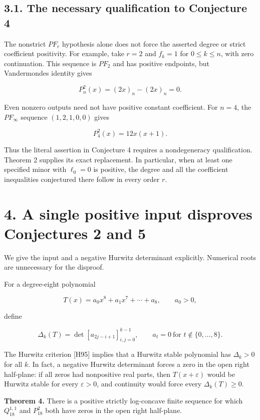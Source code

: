 \documentclass[11pt]{article}
\begin{document}
\subsection{3.1. The necessary qualification to Conjecture
4}\label{the-necessary-qualification-to-conjecture-4}

The nonstrict \(PF_r\) hypothesis alone does not force the asserted
degree or strict coefficient positivity. For example, take \(r=2\) and
\(f_k=1\) for \(0\le k\le n\), with zero continuation. This sequence is
\(PF_2\) and has positive endpoints, but Vandermonde\textquotesingle s
identity gives

\[
P_n^2(x)=(2x)_n-(2x)_n=0.
\tag{11}
\]

Even nonzero outputs need not have positive constant coefficient. For
\(n=4\), the \(PF_\infty\) sequence \((1,2,1,0,0)\) gives

\[
P_4^2(x)=12x(x+1).
\tag{12}
\]

Thus the literal assertion in Conjecture 4 requires a nondegeneracy
qualification. Theorem 2 supplies its exact replacement. In particular,
when at least one specified minor with \(\ell_0=0\) is positive, the
degree and all the coefficient inequalities conjectured there follow in
every order \(r\).

\section{4. A single positive input disproves Conjectures 2 and
5}\label{a-single-positive-input-disproves-conjectures-2-and-5}

We give the input and a negative Hurwitz determinant explicitly.
Numerical roots are unnecessary for the disproof.

For a degree-eight polynomial

\[
T(x)=a_0x^8+a_1x^7+\cdots+a_8,\qquad a_0>0,
\]

define

\[
\Delta_k(T)=\det[a_{2j-i+1}]_{i,j=0}^{k-1},
\qquad a_t=0\ \text{for }t\notin\{0,\ldots,8\}.
\tag{13}
\]

The Hurwitz criterion {[}H95{]} implies that a Hurwitz stable polynomial
has \(\Delta_k>0\) for all \(k\). In fact, a negative Hurwitz
determinant forces a zero in the open right half-plane: if all zeros had
nonpositive real parts, then \(T(x+\varepsilon)\) would be Hurwitz
stable for every \(\varepsilon>0\), and continuity would force every
\(\Delta_k(T)\ge0\).

\textbf{Theorem 4.} There is a positive strictly log-concave finite
sequence for which \(Q_{18}^{1,1}\) and \(P_{18}^2\) both have zeros in
the open right half-plane.
\end{document}

